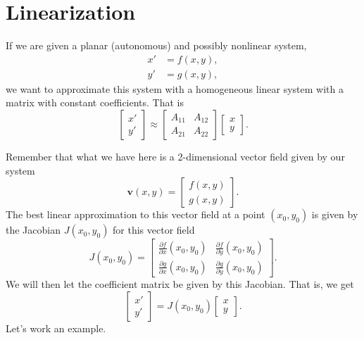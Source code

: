         \section{Linearization}
        If we are given a planar (autonomous) and possibly nonlinear system, 
        \begin{align*}
            x'&= f(x,y),\\
            y'&= g(x,y),
        \end{align*}
        we want to approximate this system with a homogeneous linear system with a matrix with constant coefficients.  That is
        \[
        \begin{bmatrix} x' \\ y' \end{bmatrix} \approx \begin{bmatrix} A_{11} & A_{12} \\ A_{21} & A_{22} \end{bmatrix} \begin{bmatrix} x \\ y \end{bmatrix}.
        \]
    
        Remember that what we have here is a 2-dimensional vector field given by our system
        \[
        \mathbf{v}(x,y) = \begin{bmatrix} f(x,y) \\ g(x,y) \end{bmatrix}.
        \]
        The best linear approximation to this vector field at a point $(x_0,y_0)$ is given by the Jacobian $J(x_0,y_0)$ for this vector field
        \[
        J(x_0,y_0) = \begin{bmatrix} \frac{\partial f}{\partial x}(x_0,y_0) & \frac{\partial f}{\partial y}(x_0,y_0) \\
        \frac{\partial g}{\partial x}(x_0,y_0) & \frac{\partial g}{\partial y}(x_0,y_0) \end{bmatrix}.
        \]
        We will then let the coefficient matrix be given by this Jacobian.  That is, we get
        \[
        \begin{bmatrix} x' \\ y' \end{bmatrix} = J(x_0,y_0)\begin{bmatrix} x \\ y \end{bmatrix}.
        \]
        Let's work an example.
        
